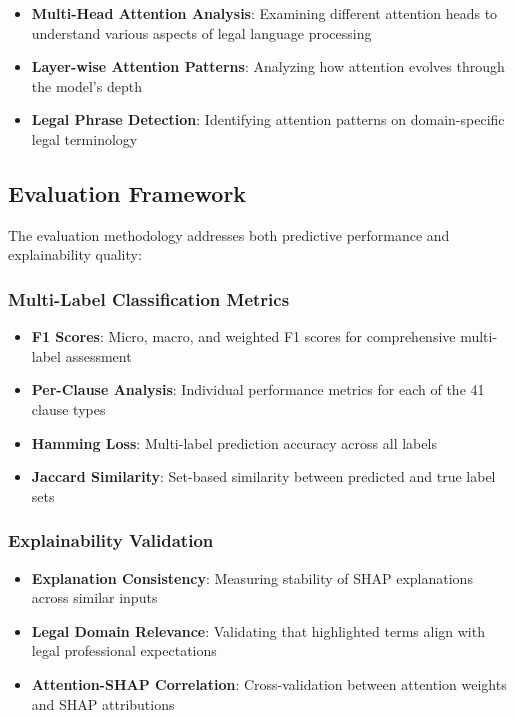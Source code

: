 \begin{itemize}
    \item \textbf{Multi-Head Attention Analysis}: Examining different attention heads to understand various aspects of legal language processing
    \item \textbf{Layer-wise Attention Patterns}: Analyzing how attention evolves through the model's depth
    \item \textbf{Legal Phrase Detection}: Identifying attention patterns on domain-specific legal terminology
\end{itemize}

\subsection{Evaluation Framework}

The evaluation methodology addresses both predictive performance and explainability quality:

\subsubsection{Multi-Label Classification Metrics}

\begin{itemize}
    \item \textbf{F1 Scores}: Micro, macro, and weighted F1 scores for comprehensive multi-label assessment
    \item \textbf{Per-Clause Analysis}: Individual performance metrics for each of the 41 clause types
    \item \textbf{Hamming Loss}: Multi-label prediction accuracy across all labels
    \item \textbf{Jaccard Similarity}: Set-based similarity between predicted and true label sets
\end{itemize}

\subsubsection{Explainability Validation}

\begin{itemize}
    \item \textbf{Explanation Consistency}: Measuring stability of SHAP explanations across similar inputs
    \item \textbf{Legal Domain Relevance}: Validating that highlighted terms align with legal professional expectations
    \item \textbf{Attention-SHAP Correlation}: Cross-validation between attention weights and SHAP attributions
\end{itemize}

